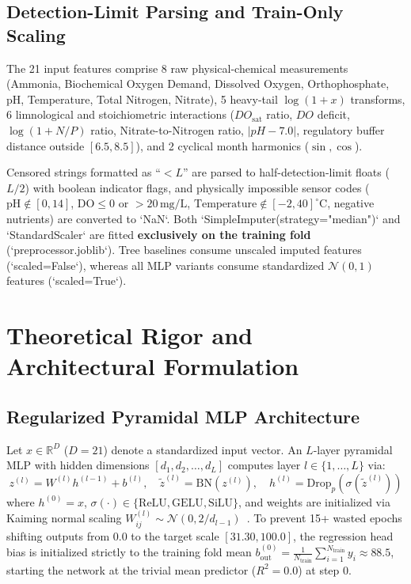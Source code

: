 \documentclass[journal,10pt,twocolumn]{IEEEtran}
\begin{document}
\subsection{Detection-Limit Parsing and Train-Only Scaling}
The 21 input features comprise 8 raw physical-chemical measurements (Ammonia, Biochemical Oxygen Demand, Dissolved Oxygen, Orthophosphate, pH, Temperature, Total Nitrogen, Nitrate), 5 heavy-tail $\log(1+x)$ transforms, 6 limnological and stoichiometric interactions ($DO_{\text{sat}}$ ratio, $DO$ deficit, $\log(1+N/P)$ ratio, Nitrate-to-Nitrogen ratio, $|pH-7.0|$, regulatory buffer distance outside $[6.5, 8.5]$), and 2 cyclical month harmonics ($\sin, \cos$).

Censored strings formatted as ``$<L$'' are parsed to half-detection-limit floats ($L/2$) with boolean indicator flags, and physically impossible sensor codes ($\text{pH} \notin [0,14]$, $\text{DO} \le 0$ or $>20\,\text{mg/L}$, $\text{Temperature} \notin [-2, 40]^\circ\text{C}$, negative nutrients) are converted to `NaN`. Both `SimpleImputer(strategy="median")` and `StandardScaler` are fitted \textbf{exclusively on the training fold} (`preprocessor.joblib`). Tree baselines consume unscaled imputed features (`scaled=False`), whereas all MLP variants consume standardized $\mathcal{N}(0, 1)$ features (`scaled=True`).

\section{Theoretical Rigor and Architectural Formulation}
\subsection{Regularized Pyramidal MLP Architecture}
Let $x \in \mathbb{R}^{D}$ ($D=21$) denote a standardized input vector. An $L$-layer pyramidal MLP with hidden dimensions $[d_1, d_2, \dots, d_L]$ computes layer $l \in \{1, \dots, L\}$ via:
\begin{equation}
    z^{(l)} = W^{(l)} h^{(l-1)} + b^{(l)}, \quad \tilde{z}^{(l)} = \text{BN}(z^{(l)}), \quad h^{(l)} = \text{Drop}_{p}\!\left(\sigma(\tilde{z}^{(l)})\right)
\end{equation}
where $h^{(0)} = x$, $\sigma(\cdot) \in \{\text{ReLU}, \text{GELU}, \text{SiLU}\}$, and weights are initialized via Kaiming normal scaling $W_{ij}^{(l)} \sim \mathcal{N}(0, 2/d_{l-1})$~\cite{he2015delving}. To prevent 15+ wasted epochs shifting outputs from $0.0$ to the target scale $[31.30, 100.0]$, the regression head bias is initialized strictly to the training fold mean $b_{\text{out}}^{(0)} = \frac{1}{N_{\text{train}}}\sum_{i=1}^{N_{\text{train}}} y_i \approx 88.5$, starting the network at the trivial mean predictor ($R^2 = 0.0$) at step 0.
\end{document}
